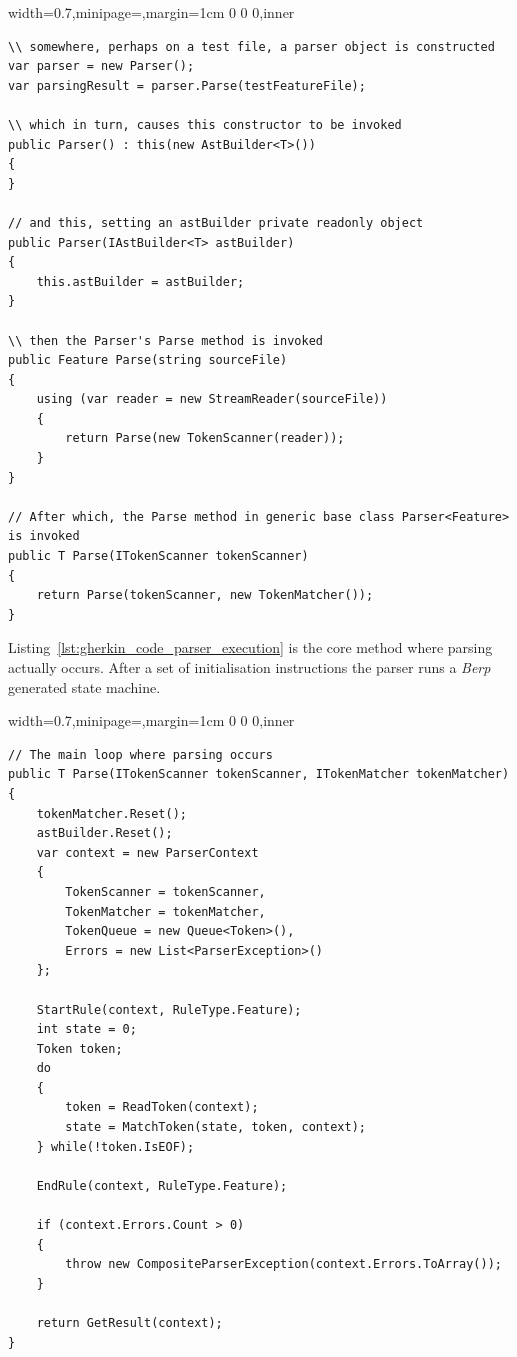 \documentclass[dissertation,final]{softeng}
\newenvironment{featurecode}[1]
{ \lrbox\featurebox \begin{adjustbox}{width=#1\textwidth,minipage=\textwidth,margin=1cm 0 0 0,inner} }
{ \end{adjustbox}\endlrbox}
\newenvironment{featurelist}[2]
{
\newcommand{\setcaption}{\caption{#1}}
\newcommand{\setlabel}{\label{#2}}
}
{\begin{listing}[h!]\centering\usebox\featurebox\setcaption\setlabel\end{listing}}
\begin{document}
\begin{featurelist}{Parser construction}{lst:gherkin_code_parser_construction}
\begin{featurecode}{0.7}
\begin{verbatim}
\\ somewhere, perhaps on a test file, a parser object is constructed
var parser = new Parser();
var parsingResult = parser.Parse(testFeatureFile);

\\ which in turn, causes this constructor to be invoked
public Parser() : this(new AstBuilder<T>())
{
}

// and this, setting an astBuilder private readonly object
public Parser(IAstBuilder<T> astBuilder)
{
    this.astBuilder = astBuilder;
}

\\ then the Parser's Parse method is invoked
public Feature Parse(string sourceFile)
{
    using (var reader = new StreamReader(sourceFile))
    {
        return Parse(new TokenScanner(reader));
    }
}

// After which, the Parse method in generic base class Parser<Feature> is invoked
public T Parse(ITokenScanner tokenScanner)
{
    return Parse(tokenScanner, new TokenMatcher());
}
\end{verbatim}
\end{featurecode}
\end{featurelist}

Listing~\ref{lst:gherkin_code_parser_execution} is the core method where parsing actually occurs. After a set of initialisation instructions the parser runs a \emph{Berp} generated state machine.

\begin{featurelist}{Parser execution}{lst:gherkin_code_parser_execution}
\begin{featurecode}{0.7}
\begin{verbatim}
// The main loop where parsing occurs
public T Parse(ITokenScanner tokenScanner, ITokenMatcher tokenMatcher)
{
    tokenMatcher.Reset();
    astBuilder.Reset();
    var context = new ParserContext
    {
        TokenScanner = tokenScanner,
        TokenMatcher = tokenMatcher,
        TokenQueue = new Queue<Token>(),
        Errors = new List<ParserException>()
    };

    StartRule(context, RuleType.Feature);
    int state = 0;
    Token token;
    do
    {
        token = ReadToken(context);
        state = MatchToken(state, token, context);
    } while(!token.IsEOF);

    EndRule(context, RuleType.Feature);

    if (context.Errors.Count > 0)
    {
        throw new CompositeParserException(context.Errors.ToArray());
    }

    return GetResult(context);
}
\end{verbatim}
\end{featurecode}
\end{featurelist}
\end{document}
